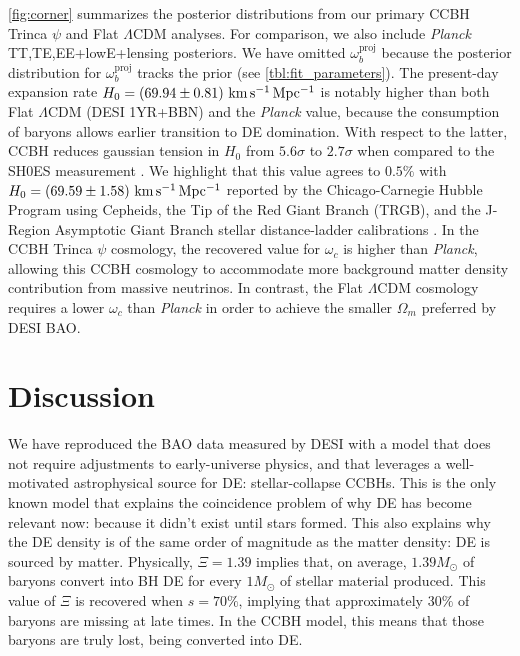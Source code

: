 \documentclass[a4paper,11pt]{article}
\newcommand{\kmsMpc}{\,{\rm km\,s^{-1}\,Mpc^{-1}}}
\begin{document}
\cref{fig:corner} summarizes the posterior distributions from our primary CCBH Trinca $\psi$ and Flat $\Lambda$CDM analyses.
For comparison, we also include \emph{Planck} TT,TE,EE+lowE+lensing posteriors.
We have omitted $\omega_b^\mathrm{proj}$ because the posterior distribution for $\omega_b^\mathrm{proj}$ tracks the prior (see \cref{tbl:fit_parameters}).
The present-day expansion rate $H_0 = (69.94\pm 0.81)\,\kmsMpc$ is notably higher than both Flat $\Lambda$CDM (DESI 1YR+BBN) and the \emph{Planck} value, because the consumption of baryons allows earlier transition to DE domination.
With respect to the latter, CCBH reduces gaussian tension in $H_0$ from $5.6\sigma$ to $2.7\sigma$ when compared to the SH0ES measurement \cite{Murakami23}.
We highlight that this value agrees to $0.5\%$ with $H_0 = (69.59 \pm 1.58)\,\kmsMpc$ reported by the Chicago-Carnegie Hubble Program using Cepheids, the Tip of the Red Giant Branch (TRGB), and the J-Region Asymptotic Giant Branch stellar distance-ladder calibrations \cite{2024arXiv240806153F}.
In the CCBH Trinca $\psi$ cosmology, the recovered value for $\omega_c$ is higher than \emph{Planck}, allowing this CCBH cosmology to accommodate more background matter density contribution from massive neutrinos.
In contrast, the Flat $\Lambda$CDM cosmology requires a lower $\omega_c$ than \emph{Planck} in order to achieve the smaller $\Omega_m$ preferred by DESI BAO.

\section{Discussion}
\label{sec:discussion}
We have reproduced the BAO data measured by DESI with a model that does not require adjustments to early-universe physics, and that leverages a well-motivated astrophysical source for DE: stellar-collapse CCBHs.
This is the only known model that explains the coincidence problem of why DE has become relevant now: because it didn't exist until stars formed.
This also explains why the DE density is of the same order of magnitude as the matter density: DE is sourced by matter.
Physically, $\Xi = 1.39$ implies that, on average, $1.39M_\odot$ of baryons convert into BH DE for every $1M_\odot$ of stellar material produced.
This value of $\Xi$ is recovered when $s = 70\%$, implying that approximately $30\%$ of baryons are missing at late times.
In the CCBH model, this means that those baryons are truly lost, being converted into DE.
\end{document}
